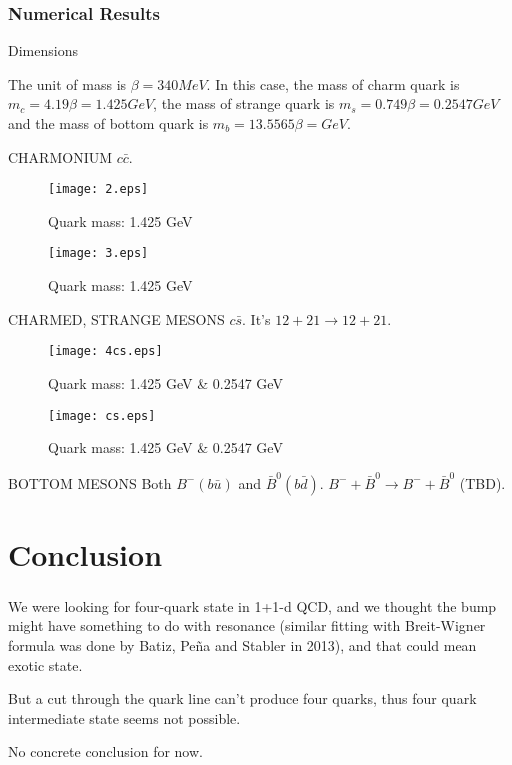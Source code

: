 \documentclass[8pt]{beamer}
\begin{document}
\begin{frame}
	\frametitle{Numerical Results}
	Dimensions

	The unit of mass is $\beta=340MeV$. In this case, the mass of charm quark is $m_c=4.19\beta=1.425GeV$, the mass of strange quark is $m_s=0.749\beta=0.2547GeV$ and the mass of bottom quark is $m_b=13.5565\beta=  GeV$.

	CHARMONIUM	$c\bar c$.



	\begin{minipage}{0.49\linewidth}
		\begin{figure}[H]
			\centering
			\texttt{[image: 2.eps]}
			\caption{Quark mass: 1.425 GeV}
			\label{fig:ccbar2}
		\end{figure}
	\end{minipage}
	\begin{minipage}{0.49\linewidth}
		\begin{figure}[H]
			\centering
			\texttt{[image: 3.eps]}
			\caption{Quark mass: 1.425 GeV}
			\label{fig:ccbar3}
		\end{figure}
	\end{minipage}

\end{frame}

\begin{frame}
	CHARMED, STRANGE MESONS
	$c\bar s$.
	It's $12+21\rightarrow12+21$.

	\begin{minipage}{0.49\linewidth}
		\begin{figure}[H]
			\centering
			\texttt{[image: 4cs.eps]}
			\caption{Quark mass: 1.425 GeV \& 0.2547 GeV }
			\label{fig:csbar}
		\end{figure}
	\end{minipage}
	\begin{minipage}{0.49\linewidth}
		\begin{figure}[H]
			\centering
			\texttt{[image: cs.eps]}
			\caption{Quark mass: 1.425 GeV \& 0.2547 GeV }
			\label{fig:csbair2}
		\end{figure}
	\end{minipage}

	BOTTOM MESONS Both $B^{-}(b\bar u)$ and $\bar B^{0}(b \bar d)$.
	$B^-+\bar B^0\rightarrow B^-+\bar B^0$ (TBD).

\end{frame}

\section{Conclusion}
\begin{frame}
	\frametitle{\insertsectionhead}
	We were looking for four-quark state in 1+1-d QCD, and we thought the bump might have something to do with resonance (similar fitting with Breit-Wigner formula was done by Batiz, Pe\~na and Stabler in 2013), and that could mean exotic state.

	But a cut through the quark line can't produce four quarks, thus four quark intermediate state seems not possible.

	No concrete conclusion for now.
\end{frame}
\end{document}
